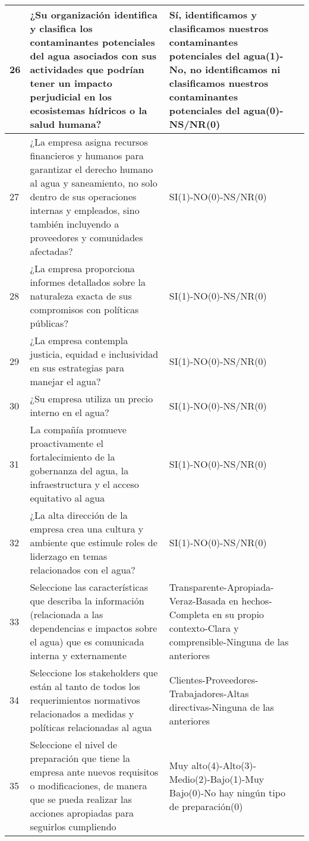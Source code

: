 \begin{longtable}{p{0.75cm}|p{6cm}|p{6cm}|p{2cm}}
\hline
26 & ¿Su organización identifica y clasifica los contaminantes potenciales del agua asociados con sus actividades que podrían tener un impacto perjudicial en los ecosistemas hídricos o la salud humana? & Sí, identificamos y clasificamos nuestros contaminantes potenciales del agua(1)-No, no identificamos ni clasificamos nuestros contaminantes potenciales del agua(0)-NS/NR(0) & \parencite{disclosure-insight-action-2023} \\
\hline
27 & ¿La empresa asigna recursos financieros y humanos para garantizar el derecho humano al agua y saneamiento, no solo dentro de sus operaciones internas y empleados, sino también incluyendo a proveedores y comunidades afectadas? & SI(1)-NO(0)-NS/NR(0) & \parencite{ceres-2023A} \\
\hline
28 & ¿La empresa proporciona informes detallados sobre la naturaleza exacta de sus compromisos con políticas públicas? & SI(1)-NO(0)-NS/NR(0) & \parencite{ceres-2023A} \\
\hline
29 & ¿La empresa contempla justicia, equidad e inclusividad en sus estrategias para manejar el agua? & SI(1)-NO(0)-NS/NR(0) & \parencite{ceres-2023A} \\
\hline
30 & ¿Su empresa utiliza un precio interno en el agua? & SI(1)-NO(0)-NS/NR(0) & \parencite{ceres-2023A} \\
\hline
31 & La compañía promueve proactivamente el fortalecimiento de la gobernanza del agua, la infraestructura y el acceso equitativo al agua & SI(1)-NO(0)-NS/NR(0) & \parencite{ceres-2023A} \\
\hline
32 & ¿La alta dirección de la empresa crea una cultura y ambiente que estimule roles de liderzago en temas relacionados con el agua? & SI(1)-NO(0)-NS/NR(0) & \parencite{iso-2015} \\
\hline
33 & Seleccione las características que describa la información (relacionada a las dependencias e impactos sobre el agua) que es comunicada interna y externamente  & Transparente-Apropiada-Veraz-Basada en hechos-Completa en su propio contexto-Clara y comprensible-Ninguna de las anteriores & \parencite{iso-2015} \\
\hline
34 & Seleccione los stakeholders que están al tanto de todos los requerimientos normativos relacionados a medidas y políticas relacionadas al agua & Clientes-Proveedores-Trabajadores-Altas directivas-Ninguna de las anteriores & \parencite{iso-2004} \\
\hline
35 & Seleccione el nivel de preparación que tiene la empresa ante nuevos requisitos o modificaciones, de manera que se pueda realizar las acciones apropiadas para seguirlos cumpliendo & Muy alto(4)-Alto(3)-Medio(2)-Bajo(1)-Muy Bajo(0)-No hay ningún tipo de preparación(0) & \parencite{iso-2004} \\

\end{longtable}
